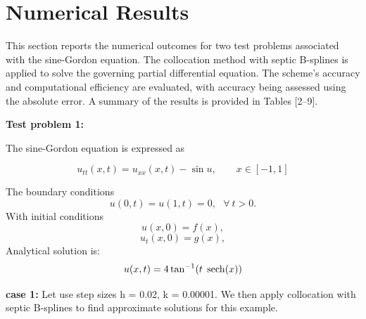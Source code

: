 \documentclass[10pt,letterpaper,twoside]{article}
\DeclareMathOperator{\sech}{sech}
\begin{document}
\section{Numerical Results}
This section reports the numerical outcomes for two test problems associated with the sine-Gordon equation. The collocation method with septic B-splines is applied to solve the governing partial differential equation. The scheme's accuracy and computational efficiency are evaluated, with accuracy being assessed using the absolute error. A summary of the results is provided in Tables [2--9].

\textbf{Test problem 1:}

The sine-Gordon equation is expressed as

\begin{equation*}
 u_{tt}(x,t)=u_{xx}(x,t)-\sin{u},\quad\quad x\in [-1,1]
\end{equation*}

The boundary conditions
\begin{equation*}
 u(0,t)=u(1,t)=0,\ \ \ \forall\ t>0.
\end{equation*}
With initial conditions
\begin{equation*}
    u(x,0) = f(x),
\end{equation*}
\begin{equation*}
 u_{t}(x,0) =g(x),
\end{equation*}
Analytical solution is:
\begin{equation}\label{p1.01}
  u(x,t)=4 \tan^{-1}(t\hspace{0.1cm}\sech(x))
\end{equation}

\textbf{case 1:} Let use step sizes h = 0.02, k = 0.00001. We then apply collocation with septic B-splines to find approximate solutions for this example.
\end{document}
